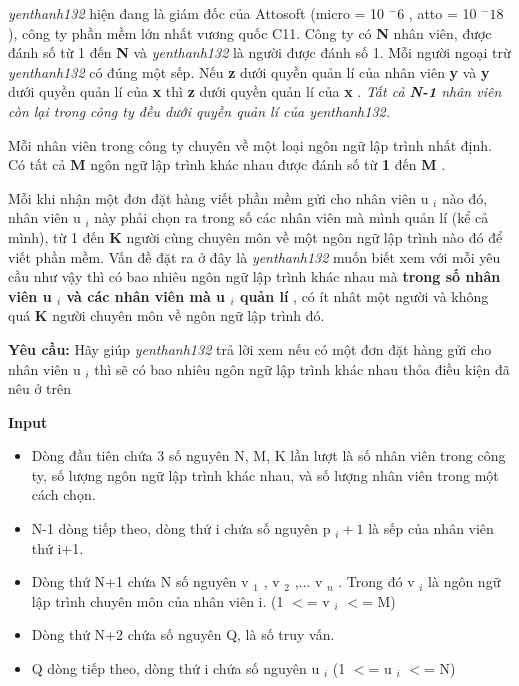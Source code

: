 



\emph{    yenthanh132   }   hiện đang là giám đốc của Attosoft (micro = 10   $^    -6   $   , atto = 10   $^    -18   $   ), công ty phần mềm lớn nhất vương quốc C11. Công ty có   \textbf{    N   }   nhân viên, được đánh số từ 1 đến   \textbf{    N   }   và   \emph{    yenthanh132   }   là người được đánh số 1. Mỗi người ngoại trừ   \emph{    yenthanh132   }   có đúng một sếp. Nếu   \textbf{    z   }   dưới quyền quản lí của nhân viên   \textbf{    y   }   và   \textbf{    y   }   dưới quyền quản lí của   \textbf{    x   }   thì   \textbf{    z   }   dưới quyền quản lí của   \textbf{    x   }   .   \emph{    Tất cả    \textbf{     N-1    }    nhân viên còn lại trong công ty đều dưới quyền quản lí của yenthanh132.   }

   Mỗi nhân viên trong công ty chuyên về một loại ngôn ngữ lập trình nhất định. Có tất cả   \textbf{    M   }   ngôn ngữ lập trình khác nhau được đánh số từ   \textbf{    1   }   đến   \textbf{    M   }   .  

   Mỗi khi nhận một đơn đặt hàng viết phần mềm gửi cho nhân viên u   $_    i   $   nào đó, nhân viên u   $_    i   $   này phải chọn ra trong số các nhân viên mà mình quản lí (kể cả mình), từ 1 đến   \textbf{    K   }   người cùng chuyên môn về một ngôn ngữ lập trình nào đó để viết phần mềm. Vấn đề đặt ra ở đây là   \emph{    yenthanh132   }   muốn biết xem với mỗi yêu cầu như vậy thì có bao nhiêu ngôn ngữ lập trình khác nhau mà   \textbf{    trong số nhân viên u    $_     i    $    và các nhân viên mà u    $_     i    $    quản lí   }   , có ít nhât một người và không quá   \textbf{    K   }   người chuyên môn về ngôn ngữ lập trình đó.  

\textbf{    Yêu cầu:   }   Hãy giúp   \emph{    yenthanh132   }   trả lời xem nếu có một đơn đặt hàng gửi cho nhân viên u   $_    i   $   thì sẽ có bao nhiêu ngôn ngữ lập trình khác nhau thỏa điều kiện đã nêu ở trên  

\textbf{    Input   }
\begin{itemize}
	\item     Dòng đầu tiên chứa 3 số nguyên N,      M, K lần lượt là số nhân viên trong công ty, số lượng ngôn ngữ lập trình      khác nhau, và số lượng nhân viên trong một cách chọn.   
	\item     N-1 dòng tiếp theo, dòng thứ i chứa số nguyên      p    $_     i+1    $    là sếp của nhân viên thứ i+1.   
	\item     Dòng thứ N+1 chứa N số nguyên v    $_     1    $    ,      v    $_     2    $    ,... v    $_     n    $    . Trong đó v    $_     i    $    là ngôn ngữ lập      trình chuyên môn của nhân viên i. (1 $<$= v    $_     i    $    $<$= M)   
	\item     Dòng thứ N+2 chứa số nguyên Q, là      số truy vấn.   
	\item     Q dòng tiếp theo, dòng thứ i chứa      số nguyên u    $_     i    $    (1 $<$= u    $_     i    $    $<$= N)   
\end{itemize}

